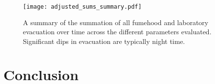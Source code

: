 	\begin{figure*}
		\centering
		\texttt{[image: adjusted\_sums\_summary.pdf]}
		\caption{A summary of the summation of all fumehood and laboratory evacuation over time across the different parameters evaluated.  Significant dips in evacuation are typically night time.}
	\end{figure*}
	

\section{Conclusion}

